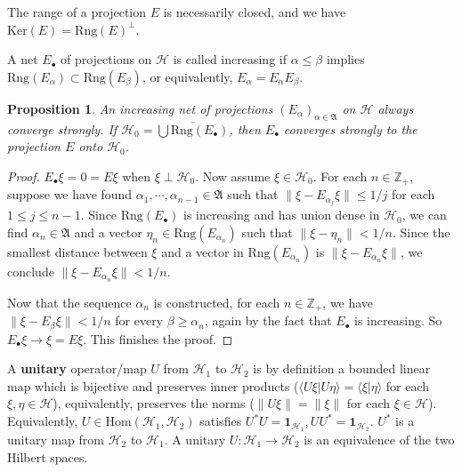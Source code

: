 \documentclass[12pt,b5paper,notitlepage]{article}
\theoremstyle{definition}
\theoremstyle{plain}
\newtheorem{pp}[df]{Proposition}
\newcommand{\fk}{\mathfrak}
\newcommand{\mc}{\mathcal}
\newcommand{\ovl}{\overline}
\newcommand{\idt}{\mathbf{1}}
\newcommand{\Hom}{\mathrm{Hom}}
\newcommand{\bk}[1]{\langle {#1}\rangle}
\newcommand{\blt}{\bullet}
\newcommand{\Zbb}{\mathbb Z}
\newcommand{\Ker}{\mathrm{Ker}}
\newcommand{\Rng}{\mathrm{Rng}}
\numberwithin{equation}{section}
\begin{document}
 



The range of a projection $E$ is necessarily closed, and we have $\Ker(E)=\Rng(E)^\perp$. 

A net $E_\blt$ of projections on $\mc H$ is called increasing if $\alpha\leq\beta$ implies $\Rng(E_\alpha)\subset\Rng(E_\beta)$, or equivalently, $E_\alpha=E_\alpha E_\beta$.

\begin{pp}
An increasing net of projections $(E_\alpha)_{\alpha\in\fk A}$ on $\mc H$ always converge strongly. If $\mc H_0=\ovl{\bigcup \Rng(E_\blt)}$, then $E_\blt$ converges strongly to the projection $E$ onto $\mc H_0$.
\end{pp}

\begin{proof}
$E_\blt\xi=0=E\xi$ when $\xi\perp\mc H_0$. Now assume $\xi\in\mc H_0$. For each $n\in\Zbb_+$, suppose we have found $\alpha_1,\cdots,\alpha_{n-1}\in\fk A$  such that $\lVert \xi-E_{\alpha_j}\xi\lVert \leq 1/j$ for each $1\leq j\leq n-1$. Since $\Rng(E_\blt)$ is increasing and has union dense in $\mc H_0$, we can find $\alpha_n\in\fk A$ and a vector $\eta_n\in\Rng(E_{\alpha_n})$ such that $\lVert\xi-\eta_n\lVert<1/n$. Since the smallest distance between $\xi$ and a vector in $\Rng(E_{\alpha_n})$ is $\lVert\xi-E_{\alpha_n}\xi\lVert$, we conclude $\lVert\xi-E_{\alpha_n}\xi\lVert<1/n$.

Now that the sequence $\alpha_n$ is constructed, for each $n\in\Zbb_+$, we have $\lVert\xi-E_\beta\xi\lVert<1/n$ for every $\beta\geq\alpha_n$, again by the fact that $E_\blt$ is increasing. So $E_\blt\xi\rightarrow \xi=E\xi$. This finishes the proof.
\end{proof}





A \textbf{unitary} operator/map $U$ from $\mc H_1$ to $\mc H_2$ is by definition a bounded linear map which is bijective and preserves inner products ($\bk {U\xi|U\eta}=\bk{\xi|\eta}$ for each $\xi,\eta\in\mc H$), equivalently, preserves the norms ($\lVert U\xi\lVert=\lVert \xi\lVert$ for each $\xi\in\mc H$). Equivalently, $U\in\Hom(\mc H_1,\mc H_2)$ satisfies $U^*U=\idt_{\mc H_1},UU^*=\idt_{\mc H_2}$. $U^*$ is a unitary map from $\mc H_2$ to $\mc H_1$. A unitary $U:\mc H_1\rightarrow\mc H_2$ is an equivalence of the two Hilbert spaces. 
\end{document}
